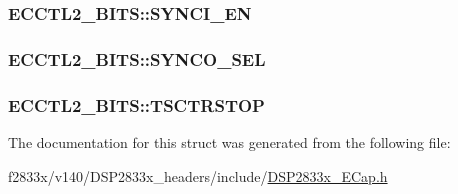 \subsubsection[{S\+Y\+N\+C\+I\+\_\+\+E\+N}]{ E\+C\+C\+T\+L2\+\_\+\+B\+I\+T\+S\+::\+S\+Y\+N\+C\+I\+\_\+\+E\+N}\label{struct_e_c_c_t_l2___b_i_t_s_af9812042d466ebeec961ae900da093a8}
\hypertarget{struct_e_c_c_t_l2___b_i_t_s_a04d25d4e6b9af8542a1b51f89370992c}{}
\subsubsection[{S\+Y\+N\+C\+O\+\_\+\+S\+E\+L}]{ E\+C\+C\+T\+L2\+\_\+\+B\+I\+T\+S\+::\+S\+Y\+N\+C\+O\+\_\+\+S\+E\+L}\label{struct_e_c_c_t_l2___b_i_t_s_a04d25d4e6b9af8542a1b51f89370992c}
\hypertarget{struct_e_c_c_t_l2___b_i_t_s_a8cbdc454e8e8a6026e2c7cc283d53e14}{}
\subsubsection[{T\+S\+C\+T\+R\+S\+T\+O\+P}]{ E\+C\+C\+T\+L2\+\_\+\+B\+I\+T\+S\+::\+T\+S\+C\+T\+R\+S\+T\+O\+P}\label{struct_e_c_c_t_l2___b_i_t_s_a8cbdc454e8e8a6026e2c7cc283d53e14}


The documentation for this struct was generated from the following file\+:\begin{DoxyCompactItemize}
\item 
f2833x/v140/\+D\+S\+P2833x\+\_\+headers/include/\hyperlink{_d_s_p2833x___e_cap_8h}{D\+S\+P2833x\+\_\+\+E\+Cap.\+h}\end{DoxyCompactItemize}
